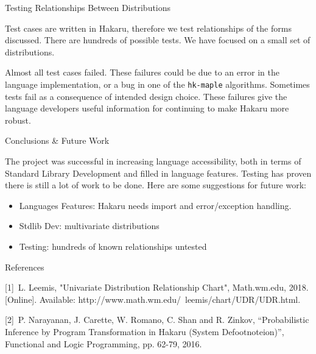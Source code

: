 \documentclass[22pt]{beamer}
\begin{document}
\begin{frame}[fragile]
\begin{textblock}{5}
\begin{block}{\Large{Testing Relationships Between Distributions}}
{\bigskip
Test cases are written in Hakaru, therefore we test relationships of the forms discussed. There are hundreds of possible tests. We have focused on a small set of distributions.

\bigskip
Almost all test cases failed. These failures could be due to an error in the language implementation, or a bug in one of the {\tt \small{hk-maple}} algorithms. Sometimes tests fail as a consequence of intended design choice. These failures give the language developers useful information for continuing to make Hakaru more robust.
}

\end{block}


\begin{block}{\Large{Conclusions \& Future Work}}

\small{The project was successful in increasing language accessibility, both in terms of Standard Library Development and filled in language features. Testing has proven there is still a lot of work to be done. Here are some suggestions for future work:

\begin{itemize}
    \item Languages Features: Hakaru needs import and error/exception handling. 
    \item Stdlib Dev: multivariate distributions
    \item Testing: hundreds of known relationships untested 
\end{itemize}

}

\end{block}


\begin{block}{\Large{References}}

\small{[1]~L. Leemis, "Univariate Distribution Relationship Chart", Math.wm.edu, 2018. [Online]. Available: http://www.math.wm.edu/~leemis/chart/UDR/UDR.html. 

[2]~P. Narayanan, J. Carette, W. Romano, C. Shan and R. Zinkov, “Probabilistic Inference by Program Transformation in Hakaru (System Defootnoteion)”, Functional and Logic Programming, pp. 62-79, 2016.}


\end{block}


% 

\end{textblock}
\end{frame}
\end{document}
